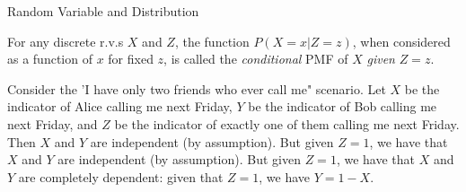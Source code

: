 \documentclass{beamer}
\newcommand{\ti}[1]{\textit{#1}}
\begin{document}
\begin{frame}{Random Variable and Distribution}
    \begin{definition}
        For any discrete r.v.s $X$ and $Z$, the function $P(X=x|Z=z)$, when considered as a function of $x$ for fixed $z$,  is called the \ti{conditional} PMF of $X$ \ti{given} $Z=z$.
    \end{definition}

    \begin{example}
        Consider the 'I have only two friends who ever call me" scenario. \newline\newline
        Let $X$ be the indicator of Alice calling me next Friday, $Y$ be the indicator of Bob calling me next Friday, and $Z$ be the indicator of exactly one of them calling me next Friday. Then $X$ and $Y$ are independent (by assumption). But given $Z=1$, we have that $X$ and $Y$ are independent (by assumption). But given $Z=1$, we have that $X$ and $Y$ are completely dependent: given that $Z=1$, we have $Y=1-X$.    
    \end{example}
\end{frame}
\end{document}
